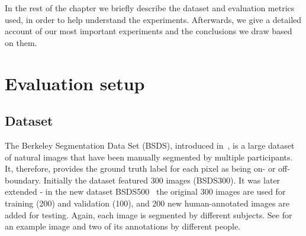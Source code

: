 In the rest of the chapter we briefly describe the dataset and evaluation metrics used, in order to help understand the experiments. Afterwards, we give a detailed account of our most important experiments and the conclusions we draw based on them.

\section{Evaluation setup}
\subsection{Dataset}
\label{sec:ch5-BSDS500-dataset}
The Berkeley Segmentation Data Set (BSDS), introduced in~\cite{Martin01}, is a large dataset of natural images that have been manually segmented by multiple participants. It, therefore, provides the ground truth label for each pixel as being on- or off-boundary. Initially the dataset featured 300 images (BSDS300). It was later extended - in the new dataset BSDS500~\cite{Arbelaez11} the original 300 images are used for training (200) and validation (100), and 200 new human-annotated images are added for testing. Again, each image is segmented by different subjects. See  for an example image and two of its annotations by different people.

